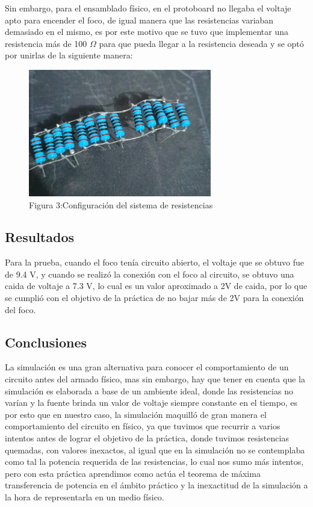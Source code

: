 Sin embargo, para el ensamblado físico, en el protoboard no llegaba el voltaje apto para encender el foco, de igual manera que las resistencias variaban demasiado en el mismo, es
por este motivo que se tuvo que implementar una resistencia más de 100 $\Omega$ para que pueda llegar a la resistencia deseada y se optó por unirlas de la siguiente manera:

\begin{figure}[htb]
    \centering
    \includegraphics[width=8cm]{media/Resistencias.jpg}
    \caption{Figura 3:Configuración del sistema de resistencias}
\end{figure}

\subsection{Resultados}

Para la prueba, cuando el foco tenía circuito abierto, el voltaje que se obtuvo fue de 9.4 V, y cuando se realizó la conexión con el foco al circuito, se obtuvo una caida de voltaje
a 7.3 V, lo cual es un valor aproximado a 2V de caida, por lo que se cumplió con el objetivo de la práctica de no bajar más de 2V para la conexión del foco.

\subsection{Conclusiones}

La simulación es una gran alternativa para conocer el comportamiento de un circuito antes del armado físico, mas sin embargo, hay que tener en cuenta que la simulación es
elaborada a base de un ambiente ideal, donde las resistencias no varían y la fuente brinda un valor de voltaje siempre constante en el tiempo, es por esto que en nuestro caso,
la simulación maquilló de gran manera el comportamiento del circuito en físico, ya que tuvimos que recurrir a varios intentos antes de lograr el objetivo de la práctica, donde
tuvimos resistencias quemadas, con valores inexactos, al igual que en la simulación no se contemplaba como tal la potencia requerida de las resistencias, lo cual nos sumo más
intentos, pero con esta práctica aprendimos como actúa el teorema de máxima transferencia de potencia en el ámbito práctico y la inexactitud de la simulación a la hora de representarla
en un medio físico.

